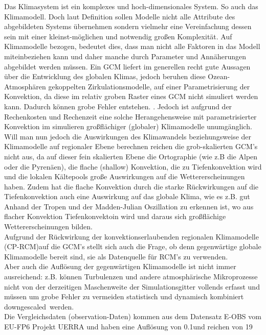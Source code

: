 Das Klimasystem ist ein komplexes und hoch-dimensionales System. So auch das Klimamodell. Doch laut Definition \cite[vgl.][]{stachowiak} sollen Modelle nicht alle Attribute des abgebildeten Systems übernehmen sondern vielmehr eine Vereinfachung dessen sein mit einer kleinst-möglichen und notwendig großen Komplexität. Auf Klimamodelle bezogen, bedeutet dies, dass man nicht alle Faktoren in das Modell miteinbeziehen kann und daher manche durch Parameter und Annäherungen abgebildet werden müssen. Ein GCM liefert im generellen recht gute Aussagen über die Entwicklung des globalen Klimas, jedoch beruhen diese Ozean-Atmosphären gekoppelten Zirkulationsmodelle, auf einer Parametrisierung der Konvektion, da diese im relativ groben Raster eines GCM nicht simuliert werden kann. Dadurch können grobe Fehler entstehen. \cite[vgl.][Stevens \& Bony]{stevensbony}. Jedoch ist aufgrund der Rechenkosten und Rechenzeit eine solche Herangehensweise mit parametrisierter Konvektion im simulieren großflächiger (globaler) Klimamodelle  unumgänglich.\\
Will man nun jedoch die Auswirkungen des Klimawandels beziehungsweise der Klimamodelle auf regionaler Ebene berechnen reichen die grob-skalierten GCM's nicht aus, da auf dieser fein skalierten Ebene die Ortographie (wie z.B die Alpen oder die Pyrenäen), die flache (shallow) Konvektion, die zu Tiefenkonvektion wird und die lokalen Kältepools große Auswirkungen auf die Wettererscheinungen haben. Zudem hat die flache Konvektion durch die starke Rückwirkungen auf die Tiefenkonvektion auch eine Auswirkung auf das globale Klima, wie es z.B. gut Anhand der Tropen \cite[vgl.][Teixeara et al.]{teixeracardoso} und der Madden-Julian Oszillation\cite[vgl.][Chen S. et al.]{chenshuyi} zu erkennen ist, wo aus flacher Konvektion Tiefenkonvektoin wird und daraus sich großflächige Wettererscheinungen bilden.\\
Aufgrund der Rückwirkung der konvektionserlaubenden regionalen Klimamodelle (CP-RCM)auf die GCM's stellt sich auch die Frage, ob denn gegenwärtige globale Klimamodelle bereit sind, sie als Datenquelle für RCM's zu verwenden.\\
Aber auch die Auflösung der gegenwärtigen Klimamodelle ist nicht immer ausreichend: z.B. können Turbulenzen und andere atmosphärische Mikroprozesse nicht von der derzeitigen Maschenweite der Simulationsgitter vollends erfasst und müssen um grobe Fehler zu vermeiden statistisch und dynamisch kombiniert \glqq downgescaled\grqq \ werden. \cite[vgl.][Maraun et al.]{marauntowards}\\
Die Vergleichsdaten (observation-Daten) kommen aus dem Datensatz  E-OBS vom EU-FP6 Projekt UERRA und haben eine Auflösung von 0.1\degree und reichen von 19



